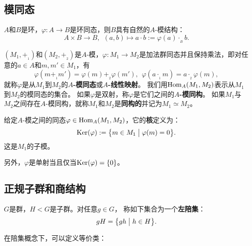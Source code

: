 \documentclass[lang=cn,10pt]{elegantbook}
\begin{document}
	\subsection{模同态}
	\begin{proposition}
		$A$和$B$是环，$\varphi\colon A\rightarrow B$是环同态，则$B$具有自然的$A$-模结构：
		\[A\times B\rightarrow B, \ \ (a,b)\mapsto  a\cdot b:=\varphi(a)\cdot_{_B} b.\]
	\end{proposition}
	\begin{definition}[$A$-模同态]
		$(M_1,+_{_1})$和$(M_2,+_{_2})$是$A$-模，$\varphi\colon M_1\rightarrow M_2$是加法群同态并且保持乘法，即对任意的$a\in A$和$m,m'\in M_1$，有
		\[\varphi(m +_{_1} m')=\varphi(m)+_{_2} \varphi(m'), \ \ \varphi(a \cdot_{_1} m)=a\cdot_{_2} \varphi(m),\]
		就称$\varphi$是从$M_1$到$M_2$的{\bf $A$-模同态}或{\bf $A$-线性映射}。
		我们用${\rm Hom}_A(M_1,M_2)$表示从$M_1$到$M_2$的模同态的集合。
		如果$\varphi$是双射，称$\varphi$是它们之间的{\bf $A$-模同构}。
		如果$M_1$与$M_2$之间存在$A$-模同构，就称$M_1$和$M_2$是{\bf 同构的}并记为$M_1\simeq M_2$。
	\end{definition}
	\begin{definition}[核]
		给定$A$-模之间的同态$\varphi\in {\rm Hom}_A(M_1,M_2)$，它的{\bf 核}定义为：
		\[{\rm Ker}(\varphi):=\big\{m\in M_1\bigm|\varphi(m)=0\big\}.\]
		这是$M_1$的子模。
		
		另外，$\varphi$是单射当且仅当${\rm Ker}(\varphi)=\{0\}$。
	\end{definition}
	
	
	\subsection{正规子群和商结构}
	\begin{definition}[左陪集]
		$G$是群，$H<G$是子群。对任意$g\in G$， 称如下集合为一个{\bf 左陪集}：
		\[gH=\big\{gh\bigm| h\in H\big\}.\]
	\end{definition}
	在陪集概念下，可以定义等价类：
	
\end{document}
